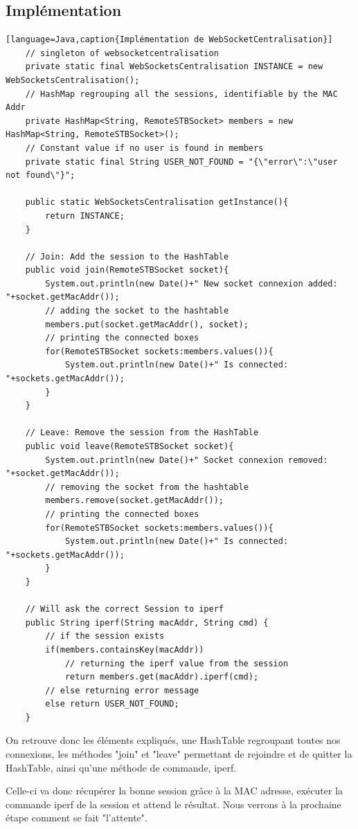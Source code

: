 \subsection{Implémentation}
\begin{lstlisting}[language=Java,caption{Implémentation de WebSocketCentralisation}]
	// singleton of websocketcentralisation
	private static final WebSocketsCentralisation INSTANCE = new WebSocketsCentralisation();
	// HashMap regrouping all the sessions, identifiable by the MAC Addr
	private HashMap<String, RemoteSTBSocket> members = new HashMap<String, RemoteSTBSocket>();
	// Constant value if no user is found in members
	private static final String USER_NOT_FOUND = "{\"error\":\"user not found\"}";
	
	public static WebSocketsCentralisation getInstance(){
		return INSTANCE;
	}
	
	// Join: Add the session to the HashTable
	public void join(RemoteSTBSocket socket){
		System.out.println(new Date()+" New socket connexion added: "+socket.getMacAddr());
		// adding the socket to the hashtable
		members.put(socket.getMacAddr(), socket);
		// printing the connected boxes
		for(RemoteSTBSocket sockets:members.values()){
			System.out.println(new Date()+" Is connected: "+sockets.getMacAddr());
		}
	}
	
	// Leave: Remove the session from the HashTable
	public void leave(RemoteSTBSocket socket){
		System.out.println(new Date()+" Socket connexion removed: "+socket.getMacAddr());
		// removing the socket from the hashtable
		members.remove(socket.getMacAddr());
		// printing the connected boxes
		for(RemoteSTBSocket sockets:members.values()){
			System.out.println(new Date()+" Is connected: "+sockets.getMacAddr());
		}
	}
	
	// Will ask the correct Session to iperf
	public String iperf(String macAddr, String cmd) {
		// if the session exists
		if(members.containsKey(macAddr))
			// returning the iperf value from the session
			return members.get(macAddr).iperf(cmd);
		// else returning error message
		else return USER_NOT_FOUND;
	}
\end{lstlisting}

On retrouve donc les éléments expliqués, une HashTable regroupant toutes nos connexions, les méthodes "join" et "leave" permettant de rejoindre et de quitter la HashTable, ainsi qu'une méthode de commande, iperf.

\medskip

Celle-ci va donc récupérer la bonne session grâce à la MAC adresse, exécuter la commande iperf de la session et attend le résultat. Nous verrons à la prochaine étape comment se fait "l'attente".

